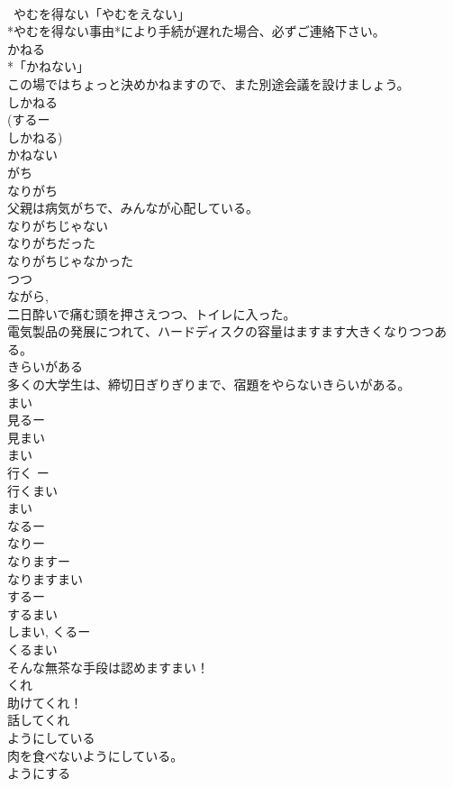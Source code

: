 \documentclass[8pt]{extreport}
\begin{document}
\begin{CJK}{UTF8}{min}
\\	~やむを得ない「やむをえない」	
\\	*やむを得ない事由*により手続が遅れた場合、必ずご連絡下さい。
\\	かねる	
\\	*「かねない」
\\	この場ではちょっと決めかねますので、また別途会議を設けましょう。
\\	しかねる	
\\	(するー
\\	しかねる)	
\\	かねない	
\\	がち	
\\	なりがち
\\	父親は病気がちで、みんなが心配している。
\\	なりがちじゃない 
\\	なりがちだった 
\\	なりがちじゃなかった 
\\	つつ	
\\	ながら, 
\\	二日酔いで痛む頭を押さえつつ、トイレに入った。
\\	電気製品の発展につれて、ハードディスクの容量はますます大きくなりつつある。
\\	きらいがある	
\\	多くの大学生は、締切日ぎりぎりまで、宿題をやらないきらいがある。
\\	まい 
\\	見るー
\\	見まい 
\\	まい 
\\	行く ー
\\	行くまい 
\\	まい 
\\	なるー
\\	なりー
\\	なりますー
\\	なりますまい　
\\	するー
\\	するまい 
\\	しまい, くるー
\\	くるまい 
\\	そんな無茶な手段は認めますまい！
\\	くれ	
\\	助けてくれ！
\\	話してくれ 
\\	ようにしている	
\\	肉を食べないようにしている。
\\	ようにする 

\end{CJK}
\end{document}
